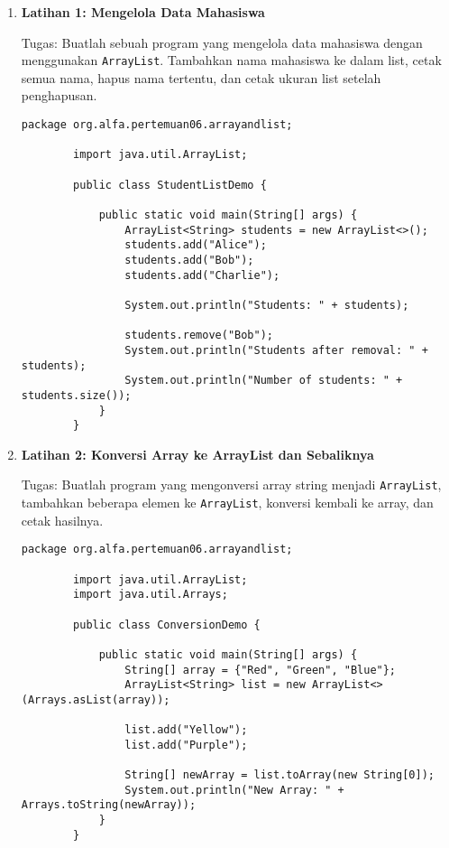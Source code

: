 \begin{enumerate}
	
	\item \textbf{Latihan 1: Mengelola Data Mahasiswa}
	
	Tugas: Buatlah sebuah program yang mengelola data mahasiswa dengan menggunakan \texttt{ArrayList}. Tambahkan nama mahasiswa ke dalam list, cetak semua nama, hapus nama tertentu, dan cetak ukuran list setelah penghapusan.
	
	\begin{lstlisting}[style=JavaStyle]
		package org.alfa.pertemuan06.arrayandlist;
		
		import java.util.ArrayList;
		
		public class StudentListDemo {
			
			public static void main(String[] args) {
				ArrayList<String> students = new ArrayList<>();
				students.add("Alice");
				students.add("Bob");
				students.add("Charlie");
				
				System.out.println("Students: " + students);
				
				students.remove("Bob");
				System.out.println("Students after removal: " + students);
				System.out.println("Number of students: " + students.size());
			}
		}
	\end{lstlisting}
	
	\item \textbf{Latihan 2: Konversi Array ke ArrayList dan Sebaliknya}
	
	Tugas: Buatlah program yang mengonversi array string menjadi \texttt{ArrayList}, tambahkan beberapa elemen ke \texttt{ArrayList}, konversi kembali ke array, dan cetak hasilnya.
	
	\begin{lstlisting}[style=JavaStyle]
		package org.alfa.pertemuan06.arrayandlist;
		
		import java.util.ArrayList;
		import java.util.Arrays;
		
		public class ConversionDemo {
			
			public static void main(String[] args) {
				String[] array = {"Red", "Green", "Blue"};
				ArrayList<String> list = new ArrayList<>(Arrays.asList(array));
				
				list.add("Yellow");
				list.add("Purple");
				
				String[] newArray = list.toArray(new String[0]);
				System.out.println("New Array: " + Arrays.toString(newArray));
			}
		}
	\end{lstlisting}
	

\end{enumerate}
